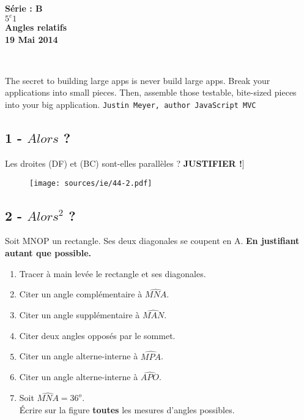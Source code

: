 \documentclass[11pt]{article}
\begin{document}

\begin{minipage}[t]{\textwidth}
  \raggedright
      {\bfseries Série : \textbf{B}}\\
      {\bfseries $5^{e}1$}\\[.35ex]
      \vspace*{-1cm}
      \raggedleft
          {\bfseries Angles relatifs}\\[.35ex]
          {\bfseries 19 Mai 2014}\\[.35ex]
\end{minipage}\\[1em]

\begin{center}
  \textsf{The secret to building large apps is never build large apps. Break your applications into small pieces. Then, assemble those testable, bite-sized pieces into your big application.}
  \texttt{Justin Meyer, author JavaScript MVC}\\
\end{center}

\setlength{\columnseprule}{1pt}
\begin{multicols}{2}
  \subsection*{1 - $Alors$ ?}

  Les droites (DF) et (BC) sont-elles parallèles ? \newline \textbf{JUSTIFIER !}] 
    \begin{figure}[H]
      \centering
      \texttt{[image: sources/ie/44-2.pdf]}
    \end{figure}

    \subsection*{2 - $Alors^{2}$ ?}
    Soit MNOP un rectangle. Ses deux diagonales se coupent en A.
    \textbf{En justifiant autant que possible.}
    \begin{enumerate}
    \item Tracer à main levée le rectangle et ses diagonales.
    \item Citer un angle complémentaire à $\widehat{MNA}$.
    \item Citer un angle supplémentaire à $\widehat{MAN}$.
    \item Citer deux angles opposés par le sommet. 
    \item Citer un angle alterne-interne à  $\widehat{MPA}$.
    \item Citer un angle alterne-interne à  $\widehat{APO}$.
    \item Soit $\widehat{MNA} = 36^{o}$.\\ Écrire sur la figure \textbf{toutes} les mesures d'angles possibles. 
    \end{enumerate}
\end{multicols}
\end{document}
